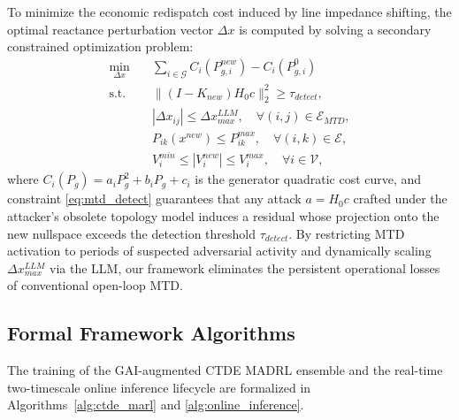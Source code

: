 \documentclass[journal,compsoc]{IEEEtran}
\begin{document}
To minimize the economic redispatch cost induced by line impedance shifting, the optimal reactance perturbation vector $\Delta x$ is computed by solving a secondary constrained optimization problem:
\begin{align}
    \min_{\Delta x} &\quad \sum_{i \in \mathcal{G}} C_i(P_{g,i}^{new}) - C_i(P_{g,i}^0) \\
    \text{s.t.} &\quad \|(I - K_{new}) H_0 c\|_2^2 \ge \tau_{detect}, \label{eq:mtd_detect} \\
    &\quad |\Delta x_{ij}| \le \Delta x_{max}^{LLM}, \quad \forall (i, j) \in \mathcal{E}_{MTD}, \nonumber \\
    &\quad P_{ik}(x^{new}) \le P_{ik}^{max}, \quad \forall (i, k) \in \mathcal{E}, \nonumber \\
    &\quad V_i^{min} \le |V_i^{new}| \le V_i^{max}, \quad \forall i \in \mathcal{V}, \nonumber
\end{align}
where $C_i(P_g) = a_i P_g^2 + b_i P_g + c_i$ is the generator quadratic cost curve, and constraint \eqref{eq:mtd_detect} guarantees that any attack $a = H_0 c$ crafted under the attacker's obsolete topology model induces a residual whose projection onto the new nullspace exceeds the detection threshold $\tau_{detect}$. By restricting MTD activation to periods of suspected adversarial activity and dynamically scaling $\Delta x_{max}^{LLM}$ via the LLM, our framework eliminates the persistent operational losses of conventional open-loop MTD.

\subsection{Formal Framework Algorithms}
The training of the GAI-augmented CTDE MADRL ensemble and the real-time two-timescale online inference lifecycle are formalized in Algorithms~\ref{alg:ctde_marl} and \ref{alg:online_inference}.
\end{document}
